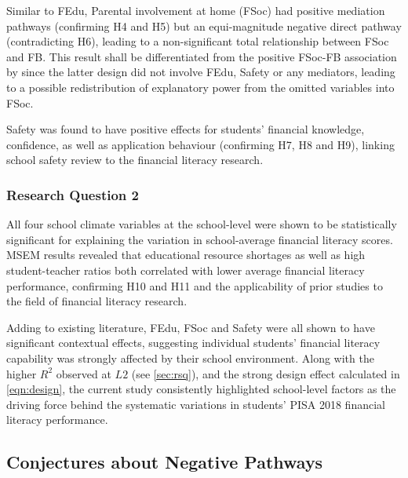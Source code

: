 Similar to FEdu, Parental involvement at home (FSoc) had positive mediation pathways (confirming H4 and H5) but an equi-magnitude negative direct pathway (contradicting H6), leading to a non-significant total relationship between FSoc and FB. This result shall be differentiated from the positive FSoc-FB association by \textcite{morenoherrero:2018a} since the latter design did not involve FEdu, Safety or any mediators, leading to a possible redistribution of explanatory power from the omitted variables into FSoc.

Safety was found to have positive effects for students' financial knowledge, confidence, as well as application behaviour (confirming H7, H8 and H9), linking  school safety review to the financial literacy research.

\subsubsection{Research Question 2}

All four school climate variables at the school-level were shown to be statistically significant for explaining the variation in school-average financial literacy scores. MSEM results revealed that educational resource shortages as well as high student-teacher ratios both correlated with lower average financial literacy performance, confirming H10 and H11 and the applicability of prior studies \parencite{finn:1999, miles:1998, uline:2008} to the field of financial literacy research.

Adding to existing literature, FEdu, FSoc and Safety were all shown to have significant contextual effects, suggesting individual students' financial literacy capability was strongly affected by their school environment. Along with the higher $R^2$ observed at $L2$ (see \cref{sec:rsq}), and the strong design effect calculated in \cref{eqn:design}, the current study consistently highlighted school-level factors as the driving force behind the systematic variations in students' PISA 2018 financial literacy performance.

\subsection{Conjectures about Negative Pathways}\label{sec:conj}

